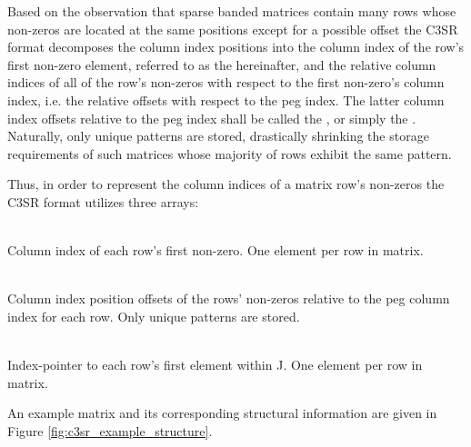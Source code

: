     Based on the observation that sparse banded matrices contain many rows whose non-zeros are located at the same
    positions except for a possible offset the C3SR format decomposes the column index positions into the column index
    of the row's first non-zero element, referred to as the  hereinafter, and the relative column
    indices of all of the row's non-zeros with respect to the first non-zero's column index, i.e. the relative offsets
    with respect to the peg index. The latter column index offsets relative to the peg index shall be called the
    , or simply the . Naturally, only unique patterns are stored,
    drastically shrinking the storage requirements of such matrices whose majority of rows exhibit the same pattern.

    Thus, in order to represent the column indices of a matrix row's non-zeros the C3SR format utilizes three arrays:

    \begin{description}[align = left, labelwidth = 4cm]
      \item [JP - \emph{Peg column indices}] \hfill \\
        Column index of each row's first non-zero. One element per row in matrix.
      \item [J - \emph{Column index patterns}] \hfill \\
        Column index position offsets of the rows' non-zeros relative to the peg
        column index for each row. Only unique patterns are stored.
      \item [JS - \emph{Patterns' index-pointers}] \hfill \\
        Index-pointer to each row's first element within J. One element per row in matrix.
    \end{description}

    An example matrix and its corresponding structural information are given in Figure \ref{fig:c3sr_example_structure}.

